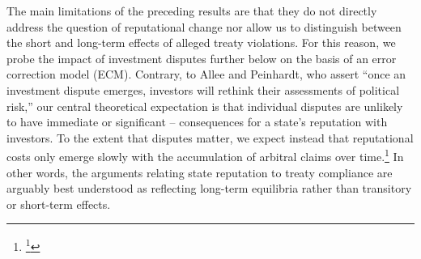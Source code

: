 \documentclass[12pt,onesided]{amsart}
\begin{document}

%

The main limitations of the preceding results are that they do not directly address the question of reputational change nor allow us to distinguish between the short and long-term effects of alleged treaty violations. For this reason, we probe the impact of investment disputes further below on the basis of an error correction model (ECM). Contrary, to Allee and Peinhardt, who assert ``once an investment dispute emerges, investors will rethink their assessments of political risk,'' our central theoretical expectation is that individual disputes are unlikely to have immediate or significant -- consequences for a state's reputation with investors. To the extent that disputes matter, we expect instead that reputational costs only emerge slowly with the accumulation of arbitral claims over time.\footnote{\footnote{\citet[p. 402]{allee:peinhardt:2011}}} In other words, the arguments relating state reputation to treaty compliance are arguably best understood as reflecting long-term equilibria rather than transitory or short-term effects.
\end{document}
